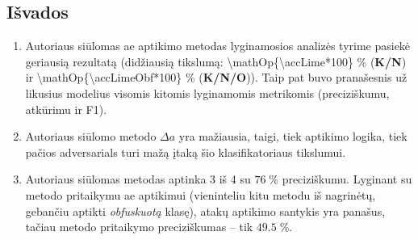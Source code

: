 \subsection*{Išvados}

\begin{enumerate}
    \item Autoriaus siūlomas \gls{ae} aptikimo metodas lyginamosios analizės tyrime pasiekė geriausią rezultatą (didžiausią tikslumą: \num{\mathOp{\accLime*100}} \% (\textbf{K/N}) ir \num{\mathOp{\accLimeObf*100}} \% (\textbf{K/N/O})). Taip pat buvo pranašesnis už likusius modelius visomis kitomis lyginamomis metrikomis (preciziškumu, atkūrimu ir F1).
    \item Autoriaus siūlomo metodo $\Delta a$ yra mažiausia, taigi, tiek  aptikimo logika, tiek pačios \glspl{adversarial} turi mažą įtaką šio klasifikatoriaus tikslumui.
    \item Autoriaus siūlomas metodas aptinka 3 iš 4  su $\num{76}\;\%$ preciziškumu. Lyginant su \LIME metodo pritaikymu \gls{ae} aptikimui (vieninteliu kitu metodu iš nagrinėtų, gebančiu aptikti \textit{obfuskuotą} klasę), atakų aptikimo santykis yra panašus, tačiau \LIME metodo pritaikymo preciziškumas -- tik $\num{49,5}\;\%$.
\end{enumerate}



\addtocounter{footnote}{-2}
